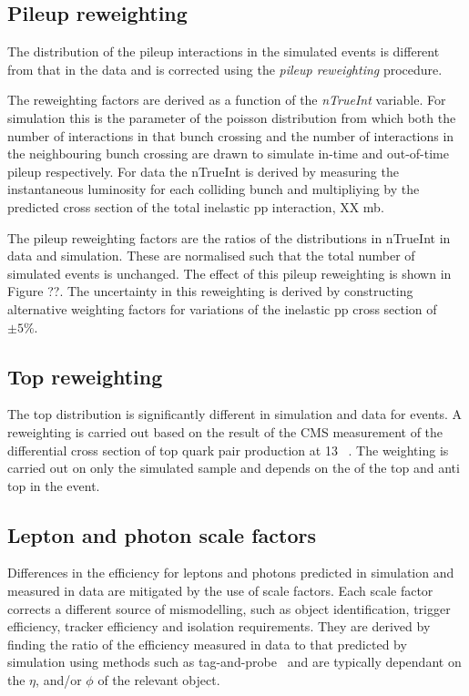 \subsection{Pileup reweighting}
The distribution of the pileup interactions in the simulated events is different from
that in the data and is corrected using the \emph{pileup reweighting} procedure. 

The reweighting factors are derived as a function of the \emph{nTrueInt} variable. 
For simulation this is the parameter of the poisson distribution from which 
both the number of interactions in that bunch crossing and the number of interactions in
the neighbouring bunch crossing are drawn to simulate in-time and out-of-time pileup
respectively. For data the nTrueInt is derived by measuring the instantaneous luminosity
for each colliding bunch and multipliying by the predicted cross section 
of the total inelastic pp interaction, XX mb. 

The pileup reweighting factors are the ratios of the distributions in nTrueInt in data
and simulation. These are normalised such that the total number of simulated events 
is unchanged. The effect of this pileup reweighting is shown in Figure ??. The uncertainty
in this reweighting is derived by constructing alternative weighting factors for variations 
of the inelastic pp cross section of $\pm5\%$.

\subsection{Top \pt reweighting}

The top \pt distribution is significantly different in simulation and data for 
\ttbar events. A reweighting is carried out based on the result of the CMS 
measurement of the differential cross section of top quark pair production 
at 13 \TeV~\cite{toppt}. The weighting is carried out on only the \ttbar 
simulated sample and depends on the \pt of the top and anti top in the event.

\subsection{Lepton and photon scale factors}
\label{sec:scale-factor}
Differences in the efficiency for leptons and photons predicted in 
simulation and measured in data are mitigated by the use of scale factors. 
Each scale factor corrects a different source of mismodelling, such as 
object identification, trigger efficiency, tracker efficiency and isolation requirements.
They are derived by finding the ratio of the efficiency measured in data to that
predicted by simulation using methods such as tag-and-probe~\cite{MuonReco} and are typically dependant on 
the $\eta$, \pt and/or $\phi$ of the relevant object.

